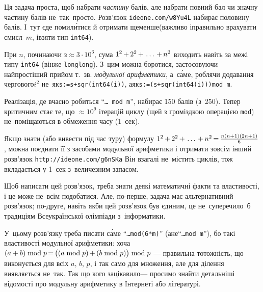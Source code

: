 \Tutorial
Ця задача проста, щоб набрати \emph{частину} балів, але набрати повний бал чи значну частину балів не~так~просто. Розв'язок \verb"ideone.com/w8Yu4L" набирає половину балів. 
І~тут є\nolinebreak[2] де помил\'{и}тися й отримати ще\nolinebreak[3] менше\nolinebreak[3] (важливо і\nolinebreak[3] правильно врахувати смисл~$m$, і\nolinebreak[3] взяти тип \texttt{int64}).

При $n$, починаючи з${}\approx3{\cdot}10^6$, сума $1^2\dib{{+}}2^2\dib{{+}}\dots\dib{{+}}n^2$ виходить навіть за межі типу \texttt{int64} (він\nolinebreak[3] же \texttt{long\nolinebreak[3] long}). З~цим можна боротися, застосовуючи найпростіший прийом т.~зв. \emph{модульної арифметики}, а~с\'{а}ме, роблячи додавання чергового\nolinebreak[3] $i^2$ не~як\nolinebreak[3] \verb"s:=s+sqr(int64(i))", а\nolinebreak[2] як\nolinebreak[3] \verb"s:=(s+sqr(int64(i)))mod m". 

Реалізація, де вчасно робиться ``\texttt{\dots~mod~m}'', набирає 150 балів (з~250). 
Тепер критичним стає те, що $\approx{}10^9$ ітерацій циклу (ще\nolinebreak[3] й з громіздкою операцією \texttt{mod}) не~поміщаються в обмеження часу (1~сек).

Якщо знати (або вивести під час туру) формулу $1^2\dib{{+}}2^2\dib{{+}}\dots\dib{{+}}n^2\dib{{=}}\frac{n(n+1)(2n+1)}{6}$, можна поєднати її з засобами модульної арифметики і отримати зовсім інший розв'язок \verb"http://ideone.com/g6nSKa"\hspace{0.5em plus 1em} Він взагалі не~містить циклів, тож вкладається у 1~сек з~величезним запасом.


Щоб написати цей розв'язок, треба знати деякі математичні факти та властивості, і це може не~всім подобатися. Але, по-перше, задача має альтернативний розв'язок; по-друге, навіть якби цей розв'язок був єдиним, це не~суперечило~б традиціям Всеукраїнської олімпіади з~інформатики.

У~цьому розв'язку треба писати с\'{а}ме ``\texttt{\dots\nolinebreak[3] mod\nolinebreak[3] \mbox{(6*m)}}'' (а\nolinebreak[2] не\nolinebreak[3] ``\texttt{\dots\nolinebreak[3] mod~m}''), бо такі властивості модульної арифметики: хоча ${(a+b)\bmod p} \dib{{=}} {\bigl((a\bmod p)}\dib{{+}}{(b\bmod p)\bigr)\bmod p}$ --- правильна тотожність, що виконується для всіх $a$, $b$, $p$, і так само для множення, але для ділення виявляється не~так.
Так що кого зацікавило\nolinebreak[3] --- просимо знайти детальніші відомості про модульну арифметику в Інтернеті або літературі.

